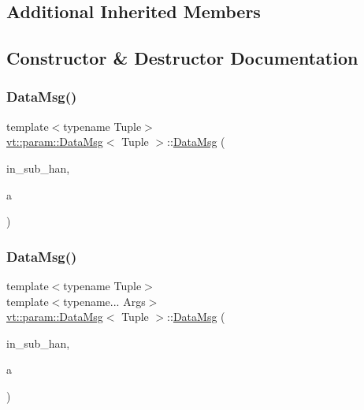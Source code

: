\subsection*{Additional Inherited Members}


\subsection{Constructor \& Destructor Documentation}
\mbox{\label{structvt_1_1param_1_1_data_msg_a9aa000cf8ea52f4b3e281153e8e94fe8}} 
\subsubsection{\texorpdfstring{Data\+Msg()}{DataMsg()}\hspace{0.1cm}{\footnotesize\ttfamily [1/2]}}
{\footnotesize\ttfamily template$<$typename Tuple$>$ \\
\hyperlink{structvt_1_1param_1_1_data_msg}{vt\+::param\+::\+Data\+Msg}$<$ Tuple $>$\+::\hyperlink{structvt_1_1param_1_1_data_msg}{Data\+Msg} (\begin{DoxyParamCaption}\item[{\hyperlink{namespacevt_af64846b57dfcaf104da3ef6967917573}{Handler\+Type} const \&}]{in\+\_\+sub\+\_\+han,  }\item[{Tuple \&\&}]{a }\end{DoxyParamCaption})\hspace{0.3cm}{\ttfamily [inline]}}

\mbox{\label{structvt_1_1param_1_1_data_msg_aae3d76ec2fbfda18cb8131cb41444e76}} 
\subsubsection{\texorpdfstring{Data\+Msg()}{DataMsg()}\hspace{0.1cm}{\footnotesize\ttfamily [2/2]}}
{\footnotesize\ttfamily template$<$typename Tuple$>$ \\
template$<$typename... Args$>$ \\
\hyperlink{structvt_1_1param_1_1_data_msg}{vt\+::param\+::\+Data\+Msg}$<$ Tuple $>$\+::\hyperlink{structvt_1_1param_1_1_data_msg}{Data\+Msg} (\begin{DoxyParamCaption}\item[{\hyperlink{namespacevt_af64846b57dfcaf104da3ef6967917573}{Handler\+Type} const \&}]{in\+\_\+sub\+\_\+han,  }\item[{Args \&\&...}]{a }\end{DoxyParamCaption})\hspace{0.3cm}{\ttfamily [inline]}}



